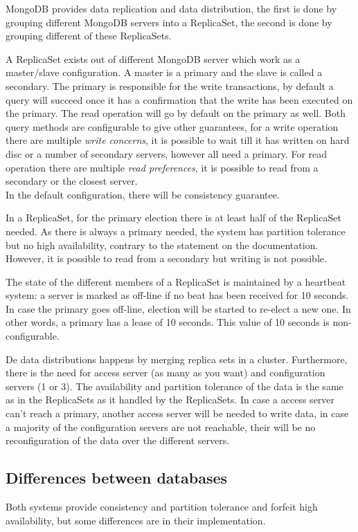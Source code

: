 \documentclass[final,5p,times]{elsarticle}
\begin{document}
MongoDB provides data replication and data distribution, the first is done by grouping different MongoDB servers into a ReplicaSet, the second is done by grouping different of these ReplicaSets. 

A ReplicaSet exists out of different MongoDB server which work as a master/slave configuration. A master is a primary and the slave is called a secondary. The primary is responsible for the write transactions, by default a query will succeed once it has a confirmation that the write has been executed on the primary. The read operation will go by default on the primary as well. Both query methods are configurable to give other guarantees, for a write operation there are multiple \textit{write concerns}, it is possible to wait till it has written on hard disc or a number of secondary servers, however all need a primary. For read operation there are multiple \textit{read preferences}, it is possible to read from a secondary or the closest server. \\ 
In the default configuration, there will be consistency guarantee.

In a ReplicaSet, for the primary election there is at least half of the ReplicaSet needed. As there is always a primary needed, the system has partition tolerance but no high availability, contrary to the statement on the documentation. However, it is possible to read from a secondary but writing is not possible.

The state of the different members of a ReplicaSet is maintained by a heartbeat system: a server is marked as off-line if no beat has been received for 10 seconds. In case the primary goes off-line, election will be started to re-elect a new one. In other words, a primary has a lease of 10 seconds. This value of 10 seconds is non-configurable. 

De data distributions happens by merging replica sets in a cluster. Furthermore, there is the need for access server (as many as you want) and configuration servers (1 or 3). The availability and partition tolerance of the data is the same as in the ReplicaSets as it handled by the ReplicaSets. In case a access server can't reach a primary, another access server will be needed to write data, in case a majority of the configuration servers are not reachable, their will be no reconfiguration of the data over the different servers.  

\subsection{Differences between databases} 
Both systems provide consistency and partition tolerance and forfeit high availability, but some differences are in their implementation. 
\end{document}
